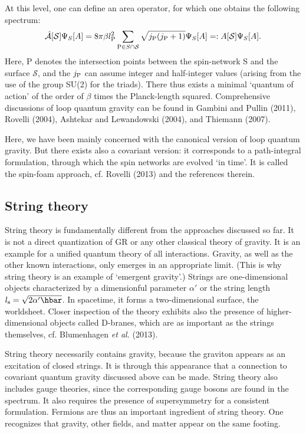 \documentclass[12pt,a4paper]{article}
\newcommand{\be}{\begin{equation}}
\newcommand{\ee}{\end{equation}}
\newcommand{\lb}{\label}
\begin{document}
At this level, one can define an area operator, for which one obtains
the following spectrum:
\be
\lb{6.31}
\hat{\mathcal A}[{\mathcal S}]\Psi_S[A]=8\pi\beta l_{\rm P}^2
\sum_{{\rm P}\in S\cap{\mathcal S}}\sqrt{j_{\rm P}(j_{\rm P}+1)}\Psi_S[A]
=: A[{\mathcal S}]\Psi_S[A].
\ee
Here, P denotes the intersection points between the spin-network S and
the surface ${\mathcal S}$, and the $j_{\rm P}$ can assume integer and
half-integer values (arising from the use of the group SU(2) for the
triads). There thus exists a minimal `quantum of action' of the order
of $\beta$ times the Planck-length squared. 
Comprehensive discussions of loop quantum gravity can be found in 
Gambini and Pullin (2011), Rovelli (2004), Ashtekar and Lewandowski
(2004), and Thiemann (2007). 

Here, we have been mainly concerned with the canonical version of loop
quantum gravity. But there
exists also a covariant version: it
corresponds to a path-integral formulation, through which the spin
networks are evolved `in time'. It is called the 
spin-foam approach, cf. Rovelli (2013) and the references therein.

\subsection{String theory}

String theory is fundamentally different from the approaches discussed
so far. It is not a direct quantization of GR or any other classical theory of
gravity. It is an example for a unified quantum theory of all
interactions. Gravity, as well as the other
known interactions, only emerges in an appropriate limit. 
(This is why string theory is an example of `emergent gravity'.) Strings are
one-dimensional objects characterized by a dimensionful parameter
$\alpha'$ or the string length $l_{\rm s}=\sqrt{2\alpha'\hbar}$.
In spacetime, it forms a two-dimensional surface,
the worldsheet. Closer inspection of the theory exhibits also the
presence of higher-dimensional objects called D-branes, which are as
important as the strings themselves, cf. Blumenhagen {\em et al.} (2013). 

String theory necessarily contains gravity, because the graviton
appears as an excitation of closed strings. It is through this
appearance that a connection to covariant quantum gravity discussed
above can be made. String theory also includes gauge theories, since
the corresponding gauge bosons are found in the spectrum. It also
requires the presence of supersymmetry for a consistent
formulation. Fermions are thus an important ingredient of string
theory. One recognizes that gravity, other fields, and matter appear
on the same footing.   
\end{document}
